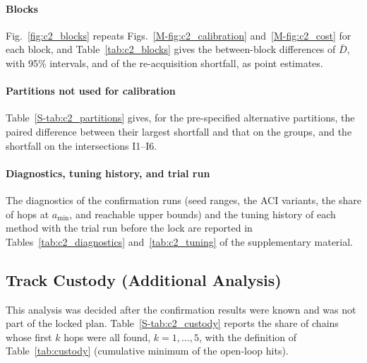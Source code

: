\paragraph*{Blocks}
Fig.~\ref{fig:c2_blocks} repeats Figs.~\ref{M-fig:c2_calibration}
and~\ref{M-fig:c2_cost} for each block, and Table~\ref{tab:c2_blocks} gives the
between-block differences of $\bar{D}$, with 95\% intervals, and of the
re-acquisition shortfall, as point estimates.

\begin{table}[!htbp]
\centering
\caption{Difference between the two blocks (autumn minus August) in $\bar{D}$ (pp, with 95\% intervals) and in the re-acquisition shortfall (pp, point estimates), per method and target.}
\label{tab:c2_blocks}
\footnotesize
{}
\end{table}

\paragraph*{Partitions not used for calibration}
Table~\ref{S-tab:c2_partitions} gives, for the pre-specified alternative partitions,
the paired difference between their largest shortfall and that on the
\numGroups{} groups, and the shortfall on the intersections I1--I6.


\paragraph*{Diagnostics, tuning history, and trial run}
The diagnostics of the confirmation runs (seed ranges, the ACI variants, the
share of hops at $a_{\min}$, and reachable upper bounds) and the tuning history
of each method with the trial run before the lock are reported in
Tables~\ref{tab:c2_diagnostics} and~\ref{tab:c2_tuning} of the supplementary
material.

\subsection{Track Custody (Additional Analysis)}
\label{app:confirm2:custody}

This analysis was decided after the confirmation results were known and was
not part of the locked plan. Table~\ref{S-tab:c2_custody} reports the share of
chains whose first $k$ hops were all found, $k=1,\dots,5$, with the definition of
Table~\ref{tab:custody} (cumulative minimum of the open-loop hits).


